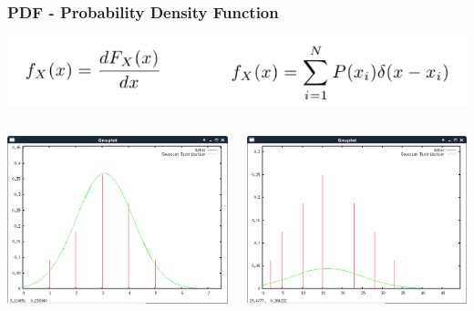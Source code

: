 \documentclass{beamer}
\begin{document}
\begin{frame}
\frametitle{PDF - Probability Density Function}
\begin{center}
\includegraphics[scale=0.35]{pdf1}
\end{center}
\begin{columns}
\begin{column}{0.5\textwidth}
\includegraphics[scale=0.25]{pdf2}
\end{column}
\begin{column}{0.5\textwidth}
\includegraphics[scale=0.25]{pdf3}
\end{column}
\end{columns}
\end{frame}
\end{document}
